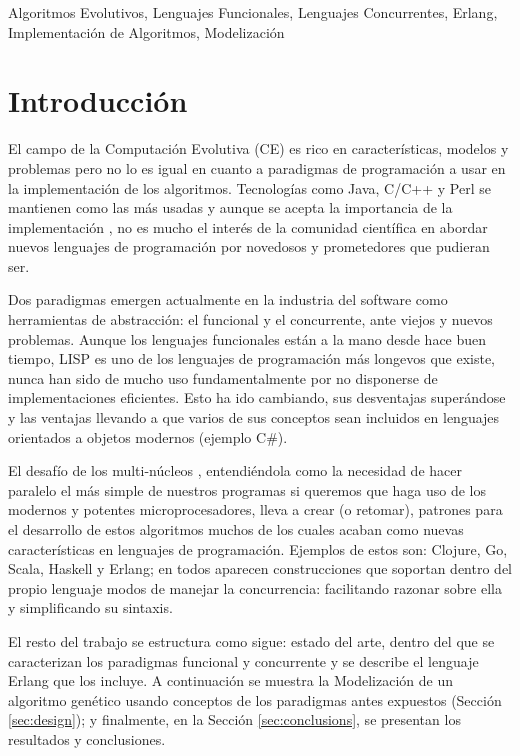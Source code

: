 \documentclass[runningheads]{llncs}
\newcommand{\keywords}[1]{\par\addvspace\baselineskip
\noindent\keywordname\enspace\ignorespaces#1}
\begin{document}
\keywords{Algoritmos Evolutivos, Lenguajes Funcionales, Lenguajes Concurrentes, Erlang, Implementación de Algoritmos, Modelización}

\section{Introducción}


\noindent El campo de la Computación Evolutiva (CE) es rico en características, modelos y problemas pero no lo es igual en cuanto a paradigmas de programación a usar en la implementación de los algoritmos. Tecnologías como Java, C/C++ y Perl se mantienen como las más usadas y aunque se acepta la importancia de la implementación \cite{DBLP:conf/iwann/MereloRACML11}, no es mucho el interés de la comunidad científica en abordar nuevos lenguajes de programación por novedosos y prometedores que pudieran ser.

Dos paradigmas emergen actualmente en la industria del software como herramientas de abstracción: el funcional y el concurrente, ante viejos y nuevos problemas. Aunque los lenguajes funcionales están a la mano desde hace buen tiempo, LISP es uno de los lenguajes de programación más longevos que existe, nunca han sido de mucho uso fundamentalmente por no disponerse de implementaciones eficientes. Esto ha ido cambiando, sus desventajas superándose y las ventajas llevando a que varios de sus conceptos sean incluidos en lenguajes orientados a objetos modernos (ejemplo C\#).

El desafío de los multi-núcleos \cite{SutterL05}, entendiéndola como la necesidad de hacer paralelo el más simple de nuestros programas si queremos que haga uso de los modernos y potentes microprocesadores, lleva a crear (o retomar), patrones para el desarrollo de estos algoritmos muchos de los cuales acaban como nuevas características en lenguajes de programación. Ejemplos de estos son: Clojure, Go, Scala, Haskell y Erlang; en todos aparecen construcciones que soportan dentro del propio lenguaje modos de manejar la concurrencia: facilitando razonar sobre ella y simplificando su sintaxis.

El resto del trabajo se estructura como sigue: estado del arte, dentro del que se caracterizan los paradigmas funcional y concurrente y se describe el lenguaje Erlang que los incluye. A continuación se muestra la Modelización de un algoritmo genético usando conceptos de los paradigmas antes expuestos (Sección \ref{sec:design}); y finalmente, en la Sección \ref{sec:conclusions}, se presentan los resultados y conclusiones.
\end{document}
